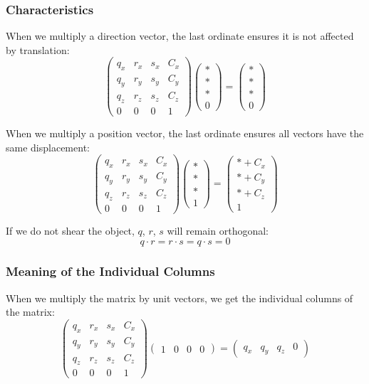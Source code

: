 \documentclass[11pt]{article}
\begin{document}
\subsubsection{Characteristics}
When we multiply a direction vector, the last ordinate ensures it is not affected by translation:
\[
  \begin{pmatrix}
    q_x & r_x & s_x & C_x \\
    q_y & r_y & s_y & C_y \\
    q_z & r_z & s_z & C_z \\
    0 & 0 & 0 & 1
  \end{pmatrix}
  \begin{pmatrix} * \\ * \\ * \\ 0 \end{pmatrix}
  =
  \begin{pmatrix} * \\ * \\ * \\ 0 \end{pmatrix}
\]

When we multiply a position vector, the last ordinate ensures all vectors have the same displacement:
\[
  \begin{pmatrix}
    q_x & r_x & s_x & C_x \\
    q_y & r_y & s_y & C_y \\
    q_z & r_z & s_z & C_z \\
    0 & 0 & 0 & 1
  \end{pmatrix}
  \begin{pmatrix} * \\ * \\ * \\ 1 \end{pmatrix}
  =
  \begin{pmatrix} * + C_x \\ * + C_y \\ * + C_z \\ 1 \end{pmatrix}
\]

If we do not shear the object, $q$, $r$, $s$ will remain orthogonal:
\[
  q \cdot r = r \cdot s = q \cdot s = 0  
\]

\subsubsection{Meaning of the Individual Columns}
When we multiply the matrix by unit vectors, we get the individual columns of the matrix:
\[
  \begin{pmatrix}
    q_x & r_x & s_x & C_x \\
    q_y & r_y & s_y & C_y \\
    q_z & r_z & s_z & C_z \\
    0 & 0 & 0 & 1
  \end{pmatrix}
  \begin{pmatrix} 1 & 0 & 0 & 0 \end{pmatrix}
  =
  \begin{pmatrix} q_x & q_y & q_z & 0 \end{pmatrix}
\]
\end{document}
